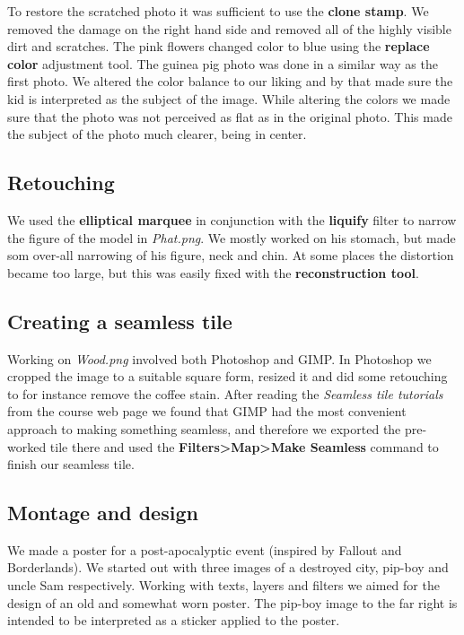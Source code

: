 \documentclass[a4paper]{article}
\begin{document}
To restore the scratched photo it was sufficient to use the \textbf{clone
stamp}. We removed the damage on the right hand side and removed all of the
highly visible dirt and scratches. The pink flowers changed color to blue using
the \textbf{replace color} adjustment tool. The guinea pig photo was done in a
similar way as the first photo. We altered the color balance to our liking and
by that made sure the kid is interpreted as the subject of the image. While
altering the colors we made sure that the photo was not perceived as flat as in
the original photo. This made the subject of the photo much clearer, being in
center.

\subsection{Retouching} %

We used the \textbf{elliptical marquee} in conjunction with the \textbf{liquify}
filter to narrow the figure of the model in \textit{Phat.png}. We mostly worked on
his stomach, but made som over-all narrowing of his figure, neck and chin. At
some places the distortion became too large, but this was easily fixed with the
\textbf{reconstruction tool}.

\subsection{Creating a seamless tile} %

Working on \textit{Wood.png} involved both Photoshop and GIMP. In Photoshop we
cropped the image to a suitable square form, resized it and did some retouching
to for instance remove the coffee stain. After reading the \textit{Seamless tile
tutorials} from the course web page we found that GIMP had the most convenient
approach to making something seamless, and therefore we exported the pre-worked
tile there and used the \textbf{Filters>Map>Make Seamless} command to finish our
seamless tile.

\subsection{Montage and design} %

We made a poster for a post-apocalyptic event (inspired by Fallout and
Borderlands). We started out with three images of a destroyed city, pip-boy and
uncle Sam respectively. Working with texts, layers and filters we aimed for the
design of an old and somewhat worn poster. The pip-boy image to the far right is
intended to be interpreted as a sticker applied to the poster.
\end{document}
